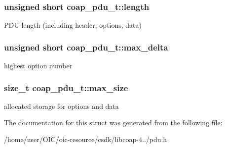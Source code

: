 \subsubsection[{length}]{\setlength{\rightskip}{0pt plus 5cm}unsigned short coap\+\_\+pdu\+\_\+t\+::length}\label{structcoap__pdu__t_aa111aeb4cf9070cea513fda7ced34286}
P\+D\+U length (including header, options, data) \hypertarget{structcoap__pdu__t_ac7cdcc1db653a3aee1f2ba1180387e2b}{}
\subsubsection[{max\+\_\+delta}]{\setlength{\rightskip}{0pt plus 5cm}unsigned short coap\+\_\+pdu\+\_\+t\+::max\+\_\+delta}\label{structcoap__pdu__t_ac7cdcc1db653a3aee1f2ba1180387e2b}
highest option number \hypertarget{structcoap__pdu__t_a5bd82194d62c90d9243313cbbbe26d47}{}
\subsubsection[{max\+\_\+size}]{\setlength{\rightskip}{0pt plus 5cm}size\+\_\+t coap\+\_\+pdu\+\_\+t\+::max\+\_\+size}\label{structcoap__pdu__t_a5bd82194d62c90d9243313cbbbe26d47}
allocated storage for options and data 

The documentation for this struct was generated from the following file\+:\begin{DoxyCompactItemize}
\item 
/home/user/\+O\+I\+C/oic-\/resource/csdk/libcoap-\/4../pdu.\+h\end{DoxyCompactItemize}
